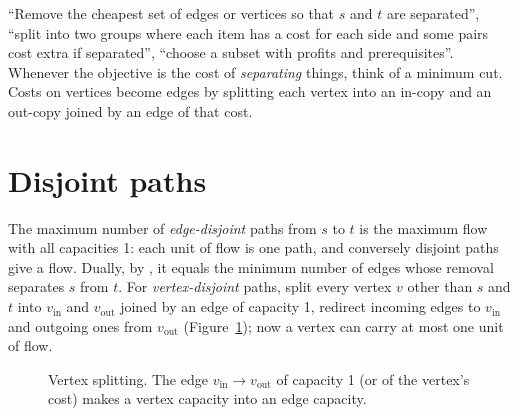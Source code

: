 \begin{recognize}
``Remove the cheapest set of edges or vertices so that $s$ and $t$ are separated'', ``split into two groups where each item has a
cost for each side and some pairs cost extra if separated'', ``choose a subset with profits and prerequisites''. Whenever the
objective is the cost of \emph{separating} things, think of a minimum cut. Costs on vertices become edges by splitting each vertex
into an in-copy and an out-copy joined by an edge of that cost.
\end{recognize}

\section[Disjoint paths]{Disjoint paths \hfill \ioi}\label{sec:disjointpaths}

The maximum number of \emph{edge-disjoint} paths from $s$ to $t$ is the maximum flow with all capacities 1: each unit of flow is one
path, and conversely disjoint paths give a flow. Dually, by , it equals the minimum number of edges whose
removal separates $s$ from $t$. For \emph{vertex-disjoint} paths, split every vertex $v$ other than $s$ and $t$ into $v_{\text{in}}$
and $v_{\text{out}}$ joined by an edge of capacity 1, redirect incoming edges to $v_{\text{in}}$ and outgoing ones from
$v_{\text{out}}$ (Figure~\ref{fig:vsplit}); now a vertex can carry at most one unit of flow.

\begin{figure}[htbp]
\centering
{}
\caption{Vertex splitting. The edge $v_{\text{in}} \to v_{\text{out}}$ of capacity 1 (or of the vertex's cost) makes a vertex
capacity into an edge capacity.}
\label{fig:vsplit}
\end{figure}

